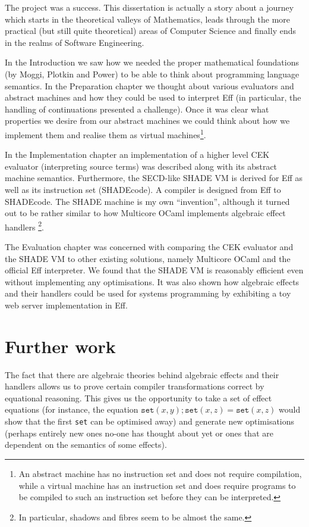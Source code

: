 \documentclass[class=article, crop=false]{standalone}
\begin{document}
The project was a success. This dissertation is actually a story about a journey
which starts in the theoretical valleys of Mathematics, leads through the more
practical (but still quite theoretical) areas of Computer Science and finally
ends in the realms of Software Engineering.

In the Introduction we saw how we needed the proper mathematical foundations
(by Moggi, Plotkin and Power) to be able to think about programming language
semantics. In the Preparation chapter we thought about various evaluators and
abstract machines and how they could be used to interpret Eff (in particular,
the handling of continuations presented a challenge). Once it was clear what
properties we desire from our abstract machines we could think about how we
implement them and realise them as virtual machines\footnote{An abstract machine
has no instruction set and does not require compilation, while a virtual machine
has an instruction set and does require programs to be compiled to such an
instruction set before they can be interpreted.}.

In the Implementation chapter an implementation of a higher level CEK evaluator
(interpreting source terms) was described along with its abstract machine
semantics. Furthermore, the SECD-like SHADE VM is derived for Eff as well as
its instruction set (SHADEcode). A compiler is designed from Eff to SHADEcode.
The SHADE machine is my own ``invention'', although it turned out to be rather
similar to how Multicore OCaml implements algebraic effect handlers
\footnote{In particular, shadows and fibres seem to be almost the same.}.

The Evaluation chapter was concerned with comparing the CEK evaluator and the
SHADE VM to other existing solutions, namely Multicore OCaml and the official
Eff interpreter. We found that the SHADE VM is reasonably efficient even without
implementing any optimisations. It was also shown how algebraic effects and
their handlers could be used for systems programming by exhibiting a toy web
server implementation in Eff.

\section{Further work}

The fact that there are algebraic theories behind algebraic effects and their
handlers allows us to prove certain compiler transformations correct by
equational reasoning. This gives us the opportunity to take a set of effect
equations (for instance, the equation $\mathtt{set}(x,y); \mathtt{set}(x,z) =
\mathtt{set}(x, z)$ would show that the first \texttt{set} can be optimised
away) and generate new optimisations (perhaps entirely new ones no-one has
thought about yet or ones that are dependent on the semantics of some effects).
\end{document}

